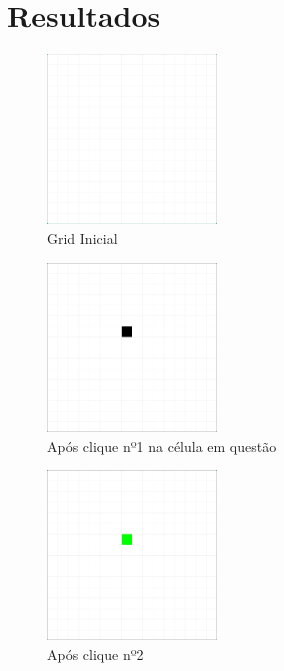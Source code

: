 \documentclass[
	12pt,				%
	oneside,			%
	a4paper,			%
	english,			%
	brazil,				%
	]{abntex2}
\begin{document}
{\section{Resultados}

\begin{figure}[H]
\centering
\includegraphics[width=0.4\textwidth]{imgs/img1.png}
\caption{Grid Inicial}
\label{Grid Inicial}
\end{figure}
\begin{figure}[H]
\centering
\includegraphics[width=0.4\textwidth]{imgs/img2.png}
\caption{Após clique nº1 na célula em questão}
\label{Após clique nº1 na célula em questão}
\end{figure}
\begin{figure}[H]
\centering
\includegraphics[width=0.4\textwidth]{imgs/img3.png}
\caption{Após clique nº2}
\label{Após clique nº2}
\end{figure}
\begin{figure}[H]
\centering

\end{figure}}
\end{document}

